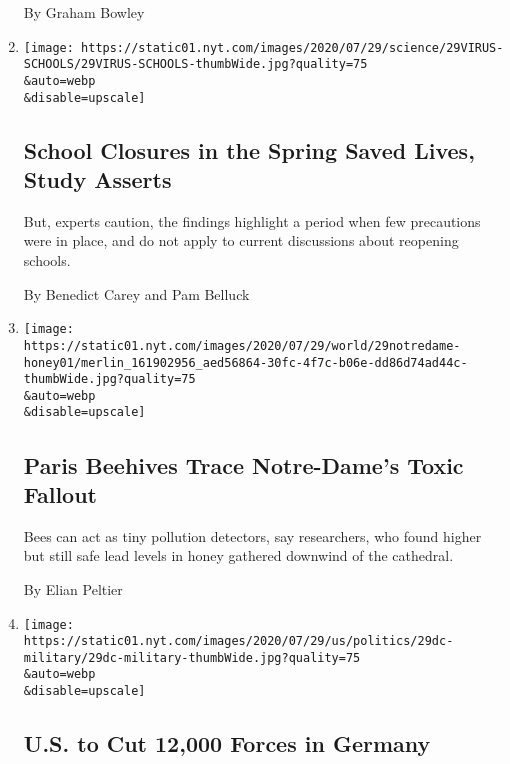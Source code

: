 \begin{enumerate}
  By Graham Bowley
\item
  \href{/2020/07/29/health/covid-school-reopening.html}{}

  \texttt{[image: https://static01.nyt.com/images/2020/07/29/science/29VIRUS-SCHOOLS/29VIRUS-SCHOOLS-thumbWide.jpg?quality=75\\\&auto=webp\\\&disable=upscale]}

  \hypertarget{school-closures-in-the-spring-saved-lives-study-asserts}{%
  \subsection{School Closures in the Spring Saved Lives, Study
  Asserts}\label{school-closures-in-the-spring-saved-lives-study-asserts}}

  But, experts caution, the findings highlight a period when few
  precautions were in place, and do not apply to current discussions
  about reopening schools.

  By Benedict Carey and Pam Belluck
\item
  \href{/2020/07/29/world/europe/honey-lead-notredame-fire-paris.html}{}

  \texttt{[image: https://static01.nyt.com/images/2020/07/29/world/29notredame-honey01/merlin\_161902956\_aed56864-30fc-4f7c-b06e-dd86d74ad44c-thumbWide.jpg?quality=75\\\&auto=webp\\\&disable=upscale]}

  \hypertarget{paris-beehives-trace-notre-dames-toxic-fallout}{%
  \subsection{Paris Beehives Trace Notre-Dame's Toxic
  Fallout}\label{paris-beehives-trace-notre-dames-toxic-fallout}}

  Bees can act as tiny pollution detectors, say researchers, who found
  higher but still safe lead levels in honey gathered downwind of the
  cathedral.

  By Elian Peltier
\item
  \href{/2020/07/29/world/europe/us-troops-nato-germany.html}{}

  \texttt{[image: https://static01.nyt.com/images/2020/07/29/us/politics/29dc-military/29dc-military-thumbWide.jpg?quality=75\\\&auto=webp\\\&disable=upscale]}

  \hypertarget{us-to-cut-12000-forces-in-germany}{%
  \subsection{U.S. to Cut 12,000 Forces in
  Germany}\label{us-to-cut-12000-forces-in-germany}}


\end{enumerate}

